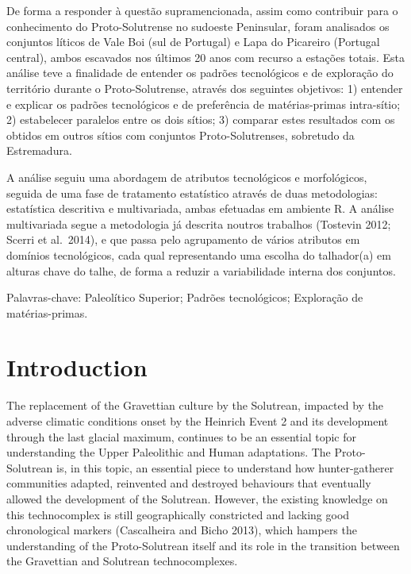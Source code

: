 \documentclass[12pt,twoside]{reedthesis}
\begin{document}
\begin{resumo}
    De forma a responder à questão supramencionada, assim como contribuir para o conhecimento do Proto-Solutrense no sudoeste Peninsular, foram analisados os conjuntos líticos de Vale Boi (sul de Portugal) e Lapa do Picareiro (Portugal central), ambos escavados nos últimos 20 anos com recurso a estações totais. Esta análise teve a finalidade de entender os padrões tecnológicos e de exploração do território durante o Proto-Solutrense, através dos seguintes objetivos: 1) entender e explicar os padrões tecnológicos e de preferência de matérias-primas intra-sítio; 2) estabelecer paralelos entre os dois sítios; 3) comparar estes resultados com os obtidos em outros sítios com conjuntos Proto-Solutrenses, sobretudo da Estremadura.
    
    A análise seguiu uma abordagem de atributos tecnológicos e morfológicos, seguida de uma fase de tratamento estatístico através de duas metodologias: estatística descritiva e multivariada, ambas efetuadas em ambiente R. A análise multivariada segue a metodologia já descrita noutros trabalhos (Tostevin 2012; Scerri et al.~2014), e que passa pelo agrupamento de vários atributos em domínios tecnológicos, cada qual representando uma escolha do talhador(a) em alturas chave do talhe, de forma a reduzir a variabilidade interna dos conjuntos.
    
    Palavras-chave: Paleolítico Superior; Padrões tecnológicos; Exploração de matérias-primas.
  \end{resumo}
  \hypersetup{linkcolor=black}
  \setcounter{tocdepth}{2}
  \tableofcontents

  \listoftables

  \listoffigures


\mainmatter %
\pagestyle{fancyplain} %

\hypertarget{introduction}{%
\chapter{Introduction}\label{introduction}}

The replacement of the Gravettian culture by the Solutrean, impacted by the adverse climatic conditions onset by the Heinrich Event 2 and its development through the last glacial maximum, continues to be an essential topic for understanding the Upper Paleolithic and Human adaptations. The Proto-Solutrean is, in this topic, an essential piece to understand how hunter-gatherer communities adapted, reinvented and destroyed behaviours that eventually allowed the development of the Solutrean. However, the existing knowledge on this technocomplex is still geographically constricted and lacking good chronological markers (Cascalheira and Bicho 2013), which hampers the understanding of the Proto-Solutrean itself and its role in the transition between the Gravettian and Solutrean technocomplexes.
\end{document}
